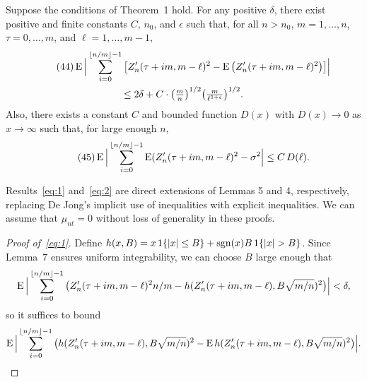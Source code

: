 \documentclass[11pt]{article}
\begin{document}
{%
\newcommand{\isum}{\sum_{i=0}^{\lfloor n/m \rfloor - 1}}
\begin{customlem}{7}
  Suppose the conditions of Theorem~1 hold.
  For any positive $\delta$, there exist positive and finite constants
  $C$, $n_0$, and $\epsilon$ such that,
  for all $n > n_0$, $m = 1,\dots,n$, $\tau = 0,\dots,m$, and $\ell =
  1,\dots,m-1$,
  \begin{multline}\label{eq:1}\tag{44}
    \E \Big\lvert \isum \big[Z_n'(\tau + i m, m - \ell)^2
    - \E \big(Z_n'(\tau + i m, m - \ell)^2\big) \big]\Big\rvert \\
    \leq 2 \delta + C \cdot \big(\tfrac{m}{n}\big)^{1/2}
    \big(\tfrac{m}{\ell^{1+\epsilon}}\big)^{1/2}.
  \end{multline}
  Also, there exists a constant $C$ and bounded function $D(x)$ with
  $D(x) \to 0$ as $x \to \infty$ such that, for large enough $n$,
  \begin{equation}
    \label{eq:2}\tag{45}
    \E \Big\lvert \isum \E(Z_n'(\tau + i m, m - \ell)^2
    - \sigma^2 \Big\rvert \leq C\, D(\ell).
  \end{equation}
\end{customlem}

Results~\eqref{eq:1} and~\eqref{eq:2} are direct extensions of
 Lemmas 5 and 4, respectively, replacing De Jong's
implicit use of inequalities with explicit inequalities. We can assume
that $\mu_{nt} = 0$ without loss of generality in these proofs.

\begin{proof}[Proof of~\eqref{eq:1}]
  Define $h(x, B) = x \operatorname{1}\{|x| \leq B\} + \operatorname{sgn}(x) B \operatorname{1}\{|x| > B\}$.
  Since Lemma~7 ensures uniform integrability, we can choose $B$ large
  enough that
  \begin{equation*}
    \operatorname{E} \Big| \sum_{i=0}^{\lfloor n/m \rfloor - 1} \big(
    Z'_n(\tau + im, m-\ell)^2 n / m -
    h(Z'_n(\tau + im, m-\ell), B \sqrt{m/n})^2\big)\Big| < \delta,
  \end{equation*}
  so it suffices to bound
  \begin{equation*}
    \operatorname{E} \Big| \sum_{i=0}^{\lfloor n/m \rfloor - 1}
    \big(h(Z'_n(\tau + im, m-\ell), B \sqrt{m/n})^2 -
    \operatorname{E} h(Z'_n(\tau + im, m-\ell), B \sqrt{m/n})^2\big)\Big|.
  \end{equation*}


\end{proof}}
\end{document}
